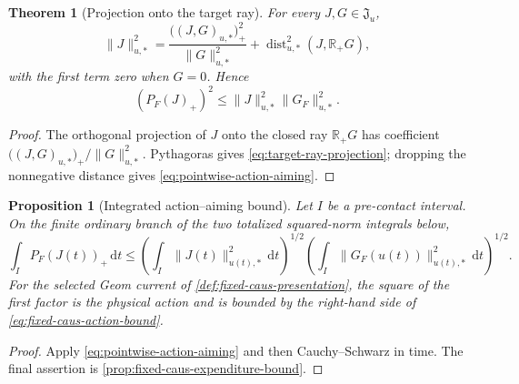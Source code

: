\documentclass[11pt]{article}
\numberwithin{section}{part}
\theoremstyle{plain}
\newtheorem{theorem}{Theorem}[section]
\newtheorem{proposition}[proposition]{Proposition}
\theoremstyle{definition}
\theoremstyle{remark}
\newcommand{\dd}{\,\mathrm d}
\newcommand{\dist}{\operatorname{dist}}
\begin{document}
\begin{theorem}[Projection onto the target ray]
\label{thm:target-ray-projection}
For every \(J,G\in\mathfrak J_u\),
\begin{equation}
 \label{eq:target-ray-projection}
 \|J\|_{u,*}^2
 =\frac{\bigl((J,G)_{u,*}\bigr)_+^2}{\|G\|_{u,*}^2}
 +\dist_{u,*}^2(J,\mathbb R_+G),
\end{equation}
with the first term zero when \(G=0\).  Hence
\begin{equation}
 \label{eq:pointwise-action-aiming}
 (P_F(J)_+)^2\le\|J\|_{u,*}^2\|G_F\|_{u,*}^2.
\end{equation}
\end{theorem}

\begin{proof}
The orthogonal projection of \(J\) onto the closed ray \(\mathbb R_+G\) has
coefficient \(\bigl((J,G)_{u,*}\bigr)_+/\|G\|_{u,*}^2\).  Pythagoras gives
\eqref{eq:target-ray-projection}; dropping the nonnegative distance gives
\eqref{eq:pointwise-action-aiming}.
\end{proof}

\begin{proposition}[Integrated action--aiming bound]
\label{prop:action-aiming-bound}
Let \(I\) be a pre-contact interval.  On the finite ordinary branch of the
two totalized squared-norm integrals below,
\begin{equation}
 \label{eq:integrated-action-aiming}
 \int_I P_F(J(t))_+\dd t
 \le
 \left(\int_I\|J(t)\|_{u(t),*}^2\dd t\right)^{1/2}
 \left(\int_I\|G_F(u(t))\|_{u(t),*}^2\dd t\right)^{1/2}.
\end{equation}
For the selected Geom current of \cref{def:fixed-caus-presentation}, the
square of the first factor is the physical action and is bounded by the
right-hand side of \eqref{eq:fixed-caus-action-bound}.
\end{proposition}

\begin{proof}
Apply \eqref{eq:pointwise-action-aiming} and then Cauchy--Schwarz in time.
The final assertion is \cref{prop:fixed-caus-expenditure-bound}.
\end{proof}
\end{document}
